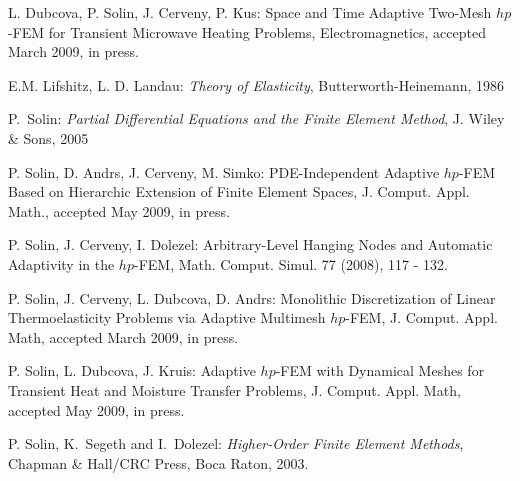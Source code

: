 \begin{thebibliography}{1}

L. Dubcova, P. Solin, J. Cerveny, P. Kus: Space and
Time Adaptive Two-Mesh $hp$-FEM for Transient Microwave
Heating Problems, Electromagnetics, accepted March 2009, in press.

E.M. Lifshitz, L. D. Landau:
{\em Theory of Elasticity},
Butterworth-Heinemann, 1986

P.~Solin: {\em Partial Differential Equations and the Finite Element Method},
J. Wiley \& Sons, 2005

P. Solin, D. Andrs, J. Cerveny, M. Simko: PDE-Independent Adaptive
$hp$-FEM Based on Hierarchic Extension of Finite Element Spaces,
J. Comput. Appl. Math., accepted May 2009, in press.

P. Solin, J. Cerveny, I. Dolezel: Arbitrary-Level
Hanging Nodes and Automatic Adaptivity in the $hp$-FEM,
Math. Comput. Simul. 77 (2008), 117 - 132.

P. Solin, J. Cerveny, L. Dubcova, D. Andrs: Monolithic
Discretization of Linear Thermoelasticity Problems via
Adaptive Multimesh $hp$-FEM, J. Comput. Appl. Math, accepted March 2009, in press.

P. Solin, L. Dubcova, J. Kruis: Adaptive $hp$-FEM with
Dynamical Meshes for Transient Heat and Moisture Transfer
Problems, J. Comput. Appl. Math, accepted May 2009, in press.

P. Solin, K.~Segeth and I.~Dolezel:
{\em Higher-Order Finite Element Methods},
Chapman \& Hall/CRC Press, Boca Raton, 2003.





\end{thebibliography}
